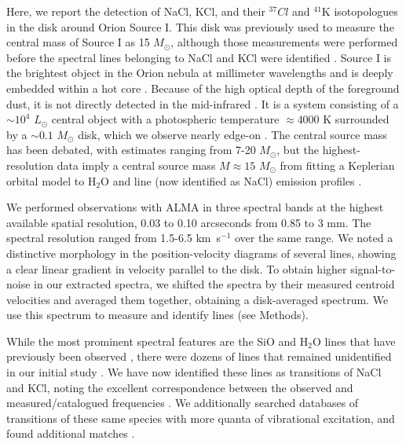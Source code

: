 \documentclass[12pt]{article}
\newcommand{\msun}{\ensuremath{M_{\odot}}\xspace}			%
\newcommand{\lsun}{\ensuremath{L_{\odot}}\xspace}			%
\newcommand{\water}{H$_{2}$O\xspace}		%
\newcommand{\kms}{\textrm{km~s}\ensuremath{^{-1}}\xspace}	%
\begin{document}
Here, we report the detection of NaCl, KCl, and their $^{37}Cl$ and $^{41}$K
isotopologues in the disk around Orion Source I.  This disk was previously used
to measure the central mass of Source I as 15 \msun, although those
measurements were performed before the spectral lines belonging to NaCl and KCl
were identified \cite{Ginsburg2018b}.  Source I is the brightest object in the
Orion nebula at millimeter wavelengths and is deeply embedded within a hot core
\cite{}. Because of the high optical depth of the foreground dust, it is not
directly detected in the
mid-infrared \cite{Robberto2005a}. It is a system consisting of a
$\sim10^4$ \lsun central object with a photospheric temperature $\approx4000$ K
\cite{Testi2010a} surrounded by a $\sim0.1$ \msun disk, which we observe
nearly edge-on \cite{Plambeck2016a}.  The central source mass has been
debated, with estimates ranging from 7-20 \msun \cite{Matthews2010a,other},
but the highest-resolution data imply a central source mass $M\approx15$ \msun
from fitting a Keplerian orbital model to \water and line (now identified as
NaCl) emission profiles \cite{Ginsburg2018b}.

We performed observations with ALMA in three spectral bands at the highest
available spatial resolution, 0.03 to 0.10 arcseconds from 0.85 to 3 mm. The
spectral resolution ranged from 1.5-6.5 \kms over the same range.  We noted a
distinctive morphology in the position-velocity diagrams of several lines,
showing a clear linear gradient in velocity parallel to the disk. To obtain
higher signal-to-noise in our extracted spectra, we shifted the spectra by
their measured centroid velocities and averaged them together, obtaining a
disk-averaged spectrum.  We use this spectrum to measure and  identify lines
(see Methods).

While the most prominent spectral features are the SiO and \water lines that
have previously been observed \cite{Goddi2013a,Hirota2014a}, there were dozens
of lines that remained unidentified in our initial study \cite{Ginsburg2018b}.
We have now identified these lines as transitions of NaCl and KCl, noting the
excellent correspondence between the observed and measured/catalogued
frequencies \cite{Caris2002a,Caris2004a,Muller2005a,Lovas2005a,Pickett1998a}.
We additionally searched databases of transitions of these same species with
more quanta of vibrational excitation, and found additional matches
\cite{Barton2014a,Cabezas2016a}.
\end{document}
